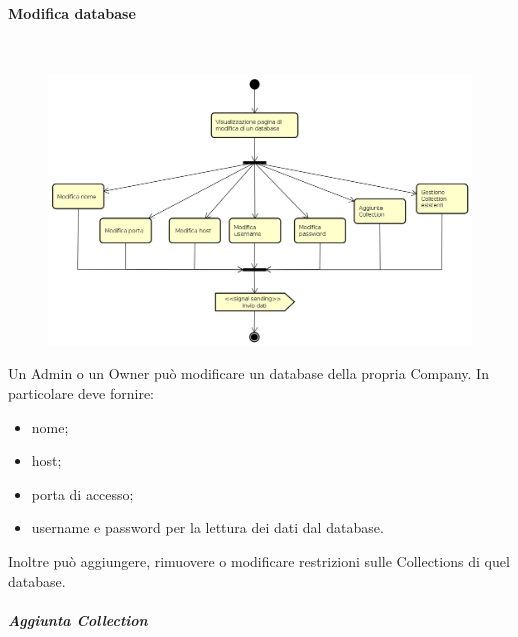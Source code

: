 \paragraph{Modifica database} \mbox{} \\
\begin{figure}[H]
\begin{center}
\includegraphics[width=15cm]{res/sections/backend/activities/modificaDatabase.png}
\end{center}
\end{figure}
Un Admin o un Owner può modificare un database della propria Company. In particolare deve fornire:
\begin{itemize}
\item nome;
\item host;
\item porta di accesso;
\item username e password per la lettura dei dati dal database.
\end{itemize}
Inoltre può aggiungere, rimuovere o modificare restrizioni sulle Collections di quel database.
\newpage
\subparagraph{Aggiunta Collection} \mbox{} \\
